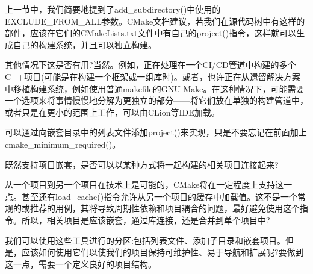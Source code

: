 
上一节中，我们简要地提到了add\_subdirectory()中使用的EXCLUDE\_FROM\_ALL参数。CMake文档建议，若我们在源代码树中有这样的部件，应该在它们的CMakeLists.txt文件中有自己的project()指令，这样就可以生成自己的构建系统，并且可以独立构建。

其他情况下这是否有用?当然。例如，正在处理在一个CI/CD管道中构建的多个C++项目(可能是在构建一个框架或一组库时)。或者，也许正在从遗留解决方案中移植构建系统，例如使用普通makefile的GNU Make。在这种情况下，可能需要一个选项来将事情慢慢地分解为更独立的部分——将它们放在单独的构建管道中，或者只是在更小的范围上工作，可以由CLion等IDE加载。

可以通过向嵌套目录中的列表文件添加project()来实现，只是不要忘记在前面加上cmake\_minimum\_required()。

既然支持项目嵌套，是否可以以某种方式将一起构建的相关项目连接起来?


从一个项目到另一个项目在技术上是可能的，CMake将在一定程度上支持这一点。甚至还有load\_cache()指令允许从另一个项目的缓存中加载值。这不是一个常规的或推荐的用例，其将导致周期性依赖和项目耦合的问题，最好避免使用这个指令。所以，相关项目是应该嵌套，通过库连接，还是合并到单个项目中?

我们可以使用这些工具进行的分区:包括列表文件、添加子目录和嵌套项目。但是，应该如何使用它们以使我们的项目保持可维护性、易于导航和扩展呢?要做到这一点，需要一个定义良好的项目结构。